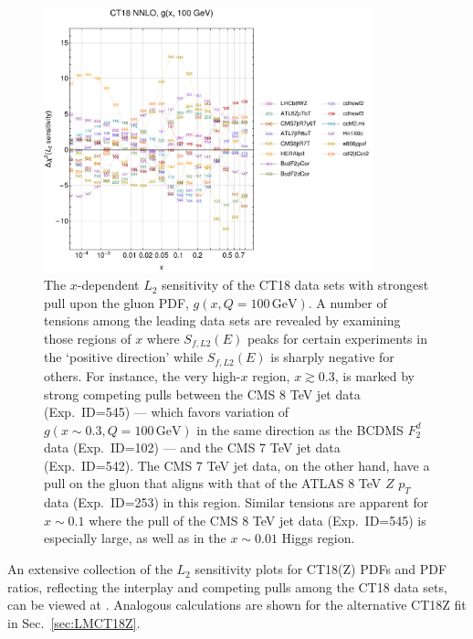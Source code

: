 \begin{figure}[!htbp]
	\begin{center}
		\includegraphics[width=0.85\textwidth]{./fig/Sens/ifl0_ct18nn_L2_q100_Sf_1.pdf}
	\end{center}
	\vspace{-2ex}
	\caption{
		The $x$-dependent $L_2$ sensitivity of the CT18 data sets with strongest
		pull upon the gluon PDF, $g(x,Q\!=\!100\,\mathrm{GeV})$. A number of tensions
		among the leading data sets are revealed by examining those regions of $x$
		where $S_{f, L2}(E)$ peaks for certain experiments in the `positive
		direction' while $S_{f, L2}(E)$ is sharply negative for others. For
		instance, the very high-$x$ region, $x\! \gtrsim\! 0.3$, is marked by
		strong competing pulls between the CMS 8 TeV jet data (Exp.~ID=545) --- which
		favors variation of $g(x\! \sim\! 0.3, Q\! =\! 100\,\mathrm{GeV})$ in the same
		direction as the BCDMS $F^d_2$ data (Exp.~ID=102) --- and the CMS 7 TeV jet data (Exp.~ID=542).
		The CMS 7 TeV jet data, on the other hand, have a pull on the gluon that
		aligns with that of the ATLAS 8 TeV $Z$ $p_T$ data (Exp.~ID=253) in this region. Similar
		tensions are apparent for $x\! \sim\! 0.1$ where the pull of the CMS 8 TeV
		jet data (Exp.~ID=545) is especially large, as well as in the $x\! \sim\! 0.01$
		Higgs region.
	}
\label{fig:L2glu}
\end{figure}

An extensive collection of the $L_2$
sensitivity plots for CT18(Z) PDFs and PDF ratios, reflecting the
interplay and competing pulls among the CT18 data sets, 
can be viewed at \cite{CT18L2Sensitivity}. Analogous calculations are shown for the
alternative CT18Z fit in Sec.~\ref{sec:LMCT18Z}.

